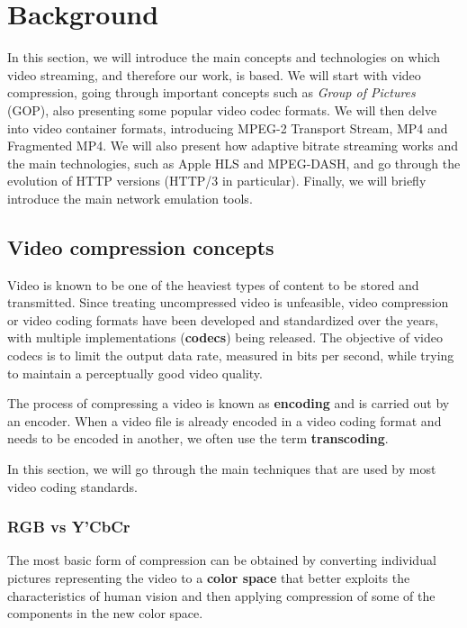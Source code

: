\chapter{Background}
\label{cha:bg}

In this section, we will introduce the main concepts and technologies on which video streaming, and therefore our work, is based. We will start with video compression, going through important concepts such as \textit{Group of Pictures} (GOP), also presenting some popular video codec formats. We will then delve into video container formats, introducing MPEG-2 Transport Stream, MP4 and Fragmented MP4. We will also present how adaptive bitrate streaming works and the main technologies, such as Apple HLS and MPEG-DASH, and go through the evolution of HTTP versions (HTTP/3 in particular). Finally, we will briefly introduce the main network emulation tools.

\section{Video compression concepts}
\label{sec:bg/compression}

Video is known to be one of the heaviest types of content to be stored and transmitted. Since treating uncompressed video is unfeasible, video compression or video coding formats have been developed and standardized over the years, with multiple implementations (\textbf{codecs}) being released. The objective of video codecs is to limit the output data rate, measured in bits per second, while trying to maintain a perceptually good video quality.

The process of compressing a video is known as \textbf{encoding} and is carried out by an encoder. When a video file is already encoded in a video coding format and needs to be encoded in another, we often use the term \textbf{transcoding}.

In this section, we will go through the main techniques that are used by most video coding standards.

\subsection{RGB vs Y'CbCr}
\label{sec:bg/compression/ycbcr}

The most basic form of compression can be obtained by converting individual pictures representing the video to a \textbf{color space} that better exploits the characteristics of human vision and then applying compression of some of the components in the new color space.

